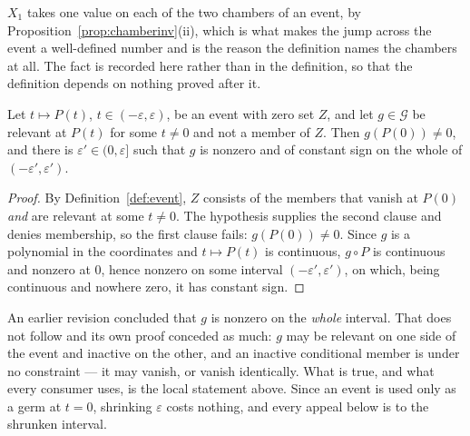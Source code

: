 \begin{remark}\label{rem:eventvalues}
$X_1$ takes one value on each of the two chambers of an event, by
Proposition~\ref{prop:chamberinv}(ii), which is what makes the jump across the event
a well-defined number and is the reason the definition names the chambers at
all. The fact is recorded here rather than in the definition, so that the
definition depends on nothing proved after it.
\end{remark}

\begin{lemma}\label{lem:guardconst}
Let $t\mapsto P(t)$, $t\in(-\varepsilon,\varepsilon)$, be an event with zero set
$Z$, and let $g\in\mathcal G$ be relevant at $P(t)$ for some $t\neq0$ and not a
member of $Z$. Then $g(P(0))\neq0$, and there is
$\varepsilon'\in(0,\varepsilon]$ such that $g$ is nonzero and of constant sign
on the whole of $(-\varepsilon',\varepsilon')$.
\end{lemma}
\begin{proof}
By Definition~\ref{def:event}, $Z$ consists of the members that vanish at
$P(0)$ \emph{and} are relevant at some $t\neq0$. The hypothesis supplies the
second clause and denies membership, so the first clause fails: $g(P(0))\neq0$.
Since $g$ is a polynomial in the coordinates and $t\mapsto P(t)$ is continuous,
$g\circ P$ is continuous and nonzero at $0$, hence nonzero on some interval
$(-\varepsilon',\varepsilon')$, on which, being continuous and nowhere zero, it
has constant sign.
\end{proof}

\begin{remark}\label{rem:guardlocal}
An earlier revision concluded that $g$ is nonzero on the \emph{whole} interval.
That does not follow and its own proof conceded as much: $g$ may be relevant on
one side of the event and inactive on the other, and an inactive conditional
member is under no constraint --- it may vanish, or vanish identically. What is
true, and what every consumer uses, is the local statement above. Since an
event is used only as a germ at $t=0$, shrinking $\varepsilon$ costs nothing,
and every appeal below is to the shrunken interval.
\end{remark}

